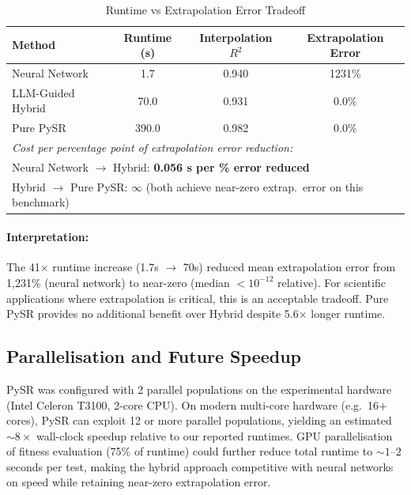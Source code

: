 \documentclass[11pt,a4paper]{article}
\begin{document}
\begin{table}[H]
\centering
\caption{Runtime vs Extrapolation Error Tradeoff}
\label{tab:cost_accuracy_tradeoff}
\begin{tabular}{lccc}
\toprule
\textbf{Method} & \textbf{Runtime (s)} & \textbf{Interpolation $R^2$} & \textbf{Extrapolation Error} \\
\midrule
Neural Network & 1.7 & 0.940 & 1231\% \\
LLM-Guided Hybrid & 70.0 & 0.931 & 0.0\% \\
Pure PySR & 390.0 & 0.982 & 0.0\% \\
\midrule
\multicolumn{4}{l}{\textit{Cost per percentage point of extrapolation error reduction:}} \\
\multicolumn{4}{l}{Neural Network $\to$ Hybrid: \textbf{0.056 s per \% error reduced}} \\
\multicolumn{4}{l}{Hybrid $\to$ Pure PySR: \textbf{$\infty$} (both achieve near-zero extrap.\ error on this benchmark)} \\
\bottomrule
\end{tabular}
\end{table}

\paragraph{Interpretation:} The 41$\times$ runtime increase (1.7s $\to$ 70s) reduced mean extrapolation error from 1,231\% (neural network) to near-zero (median $< 10^{-12}$ relative). For scientific applications where extrapolation is critical, this is an acceptable tradeoff. Pure PySR provides no additional benefit over Hybrid despite 5.6$\times$ longer runtime.

\subsection{Parallelisation and Future Speedup}

PySR was configured with 2 parallel populations on the experimental hardware (Intel Celeron T3100, 2-core CPU). On modern multi-core hardware (e.g.\ 16+ cores), PySR can exploit 12 or more parallel populations, yielding an estimated ${\sim}8\times$ wall-clock speedup relative to our reported runtimes. GPU parallelisation of fitness evaluation (75\% of runtime) could further reduce total runtime to ${\sim}1$--$2$ seconds per test, making the hybrid approach competitive with neural networks on speed while retaining near-zero extrapolation error.
\end{document}
